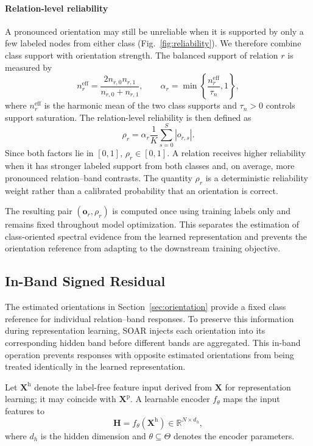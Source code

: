 \documentclass[10pt,journal]{IEEEtran}
\begin{document}
\paragraph{Relation-level reliability}
A pronounced orientation may still be unreliable when it is supported by
only a few labeled nodes from either class (Fig.~\ref{fig:reliability}). We therefore combine class support
with orientation strength. The balanced support of relation $r$ is measured by
\begin{equation}
n_r^{\mathrm{eff}}
=
\frac{2n_{r,0}n_{r,1}}
{n_{r,0}+n_{r,1}},
\qquad
\alpha_r
=
\min\left\{
\frac{n_r^{\mathrm{eff}}}{\tau_n},
1
\right\},
\label{eq:support_factor}
\end{equation}
where $n_r^{\mathrm{eff}}$ is the harmonic mean of the two class supports and
$\tau_n>0$ controls support saturation. The relation-level reliability is
then defined as
\begin{equation}
\rho_r
=
\alpha_r
\frac{1}{K}
\sum_{s=0}^{S}|o_{r,s}|.
\label{eq:reliability}
\end{equation}
Since both factors lie in $[0,1]$, $\rho_r\in[0,1]$.
A relation receives higher reliability when it has stronger labeled support
from both classes and, on average, more pronounced relation--band contrasts.
The quantity $\rho_r$ is a deterministic reliability weight rather than a
calibrated probability that an orientation is correct.

The resulting pair $(\mathbf{o}_r,\rho_r)$ is computed once using training
labels only and remains fixed throughout model optimization. This separates
the estimation of class-oriented spectral evidence from the learned
representation and prevents the orientation reference from adapting to the
downstream training objective.


\subsection{In-Band Signed Residual}
\label{sec:residual}

The estimated orientations in Section~\ref{sec:orientation} provide a fixed
class reference for individual relation--band responses. To preserve this
information during representation learning, SOAR injects each orientation
into its corresponding hidden band before different bands are aggregated.
This in-band operation prevents responses with opposite estimated orientations
from being treated identically in the learned representation.

Let $\mathbf{X}^{\mathrm h}$ denote the label-free feature input derived from
$\mathbf{X}$ for representation learning; it may coincide with
$\mathbf{X}^{\mathrm p}$. A learnable encoder $f_\theta$ maps the input
features to
\begin{equation}
\mathbf{H}
=
f_\theta(\mathbf{X}^{\mathrm h})
\in\mathbb{R}^{N\times d_h},
\label{eq:hidden}
\end{equation}
where $d_h$ is the hidden dimension and $\theta\subseteq\Theta$ denotes the
encoder parameters.
\end{document}
